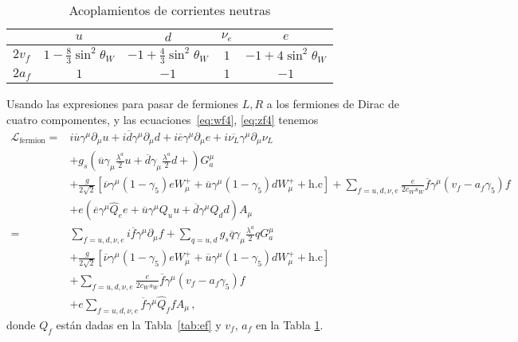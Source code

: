 \begin{frame}
\begin{table}  %
  \centering %
  \begin{tabular}{l|c|c|c|c} %
   &$u$&$d$&$\nu_e$&$e$\\\hline{}
$2v_f$&$1-\frac{8}{3}\sin^2\theta_W$&$-1+\frac{4}{3}\sin^2\theta_W$&$1$&$-1+4\sin^2\theta_W$\\
$2a_f$&$1$&$-1$&$1$&$-1$\\
  \end{tabular} %
  \caption{Acoplamientos de corrientes neutras} %
\label{tab:zcoup}
\end{table} %
\end{frame}

Usando las expresiones para pasar de fermiones $L,R$ a los fermiones de Dirac de cuatro compomentes, y las ecuaciones~\eqref{eq:wf4}, \eqref{eq:zf4} tenemos
\begin{align}
\label{eq:lfermionfin}
   \mathcal{L}_{\text{fermion}}
  =&i\overline{u}\gamma^\mu\partial_\mu u+i\overline{d}\gamma^\mu\partial_\mu d+i\overline{e}\gamma^\mu{\partial}_\mu e
+i\overline{\nu_L}\gamma^\mu{\partial}_\mu \nu_L\nonumber\\
&+g_s \left(\overline{u}\gamma_\mu\frac{\lambda^a}{2}u
+\overline{d}\gamma_\mu\frac{\lambda^a}{2}d+ \right)G^\mu_a\nonumber\\
&+\frac{g}{2\sqrt{2}}\left[\overline{\nu}\gamma^\mu(1-\gamma_5)eW_\mu^++
\overline{u}\gamma^\mu(1-\gamma_5)d W_\mu^++\text{h.c}\right]
+\sum_{f=u,d,\nu,e}\frac{e}{2c_W s_W}\overline{f}\gamma^\mu\left(v_f-a_f\gamma_5\right)f\nonumber\\
&+e\left(\overline{e}\gamma^\mu \widehat{Q}_e e+
\overline{u}\gamma^\mu {Q}_u u+
\overline{d}\gamma^\mu {Q}_d d\right) A_\mu\nonumber\\
    =&\sum_{f=u,d,\nu,e}i\overline{f}\gamma^\mu\partial_\mu f+\sum_{q=u,d}g_s\overline{q}\gamma_\mu\frac{\lambda^a}{2}qG^\mu_a\nonumber\\
&+\frac{g}{2\sqrt{2}}\left[\overline{\nu}\gamma^\mu(1-\gamma_5)eW_\mu^++
\overline{u}\gamma^\mu(1-\gamma_5)d W_\mu^++\text{h.c}\right]\nonumber\\
&+\sum_{f=u,d,\nu,e}\frac{e}{2c_W s_W}\overline{f}\gamma^\mu\left(v_f-a_f\gamma_5\right)f\nonumber\\
&+e\sum_{f=u,d,\nu,e}\overline{f}\gamma^\mu \widehat{Q}_f f A_\mu\,,
\end{align}
donde $Q_f$ están dadas en la Tabla~\ref{tab:ef} y $v_f$, $a_f$ en la Tabla \ref{tab:zcoup}.





